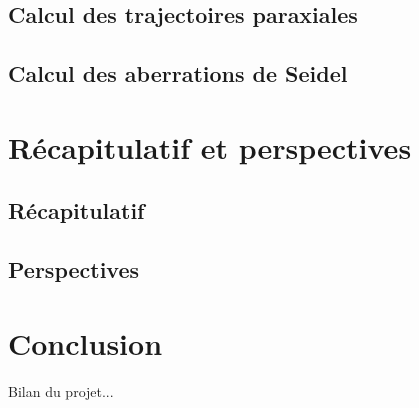 \documentclass[12pt,a4paper]{report} %
\begin{document}
\section{Calcul des trajectoires paraxiales}

\section{Calcul des aberrations de Seidel}

\chapter{Récapitulatif et perspectives}
\section{Récapitulatif}
\section{Perspectives}

\chapter*{Conclusion}
Bilan du projet...

\newpage
\listoffigures
{}

\listoftables
{}

\newpage


\end{document}
